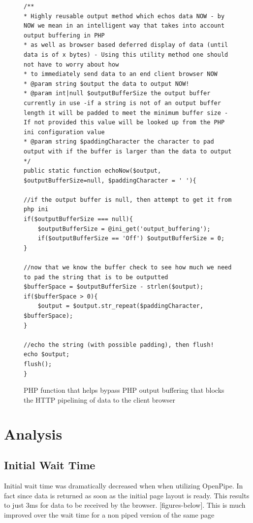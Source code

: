 \documentclass[12pt]{report}
\begin{document}
\begin{figure}[H]
\caption{PHP function that helps bypass PHP output buffering that blocks the HTTP pipelining of data to the client browser}
\label{fig:echoNowCode}
\begin{lstlisting}
/**
* Highly reusable output method which echos data NOW - by NOW we mean in an intelligent way that takes into account output buffering in PHP
* as well as browser based deferred display of data (until data is of x bytes) - Using this utility method one should not have to worry about how 
* to immediately send data to an end client browser NOW
* @param string $output the data to output NOW!
* @param int|null $outputBufferSize the output buffer currently in use -if a string is not of an output buffer length it will be padded to meet the minimum buffer size - If not provided this value will be looked up from the PHP ini configuration value 
* @param string $paddingCharacter the character to pad output with if the buffer is larger than the data to output
*/
public static function echoNow($output, $outputBufferSize=null, $paddingCharacter = ' '){

//if the output buffer is null, then attempt to get it from php ini
if($outputBufferSize === null){
	$outputBufferSize = @ini_get('output_buffering');
	if($outputBufferSize == 'Off') $outputBufferSize = 0;
}
		
//now that we know the buffer check to see how much we need to pad the string that is to be outputted
$bufferSpace = $outputBufferSize - strlen($output);
if($bufferSpace > 0){
	$output = $output.str_repeat($paddingCharacter, $bufferSpace);
}

//echo the string (with possible padding), then flush!
echo $output;
flush();
}
\end{lstlisting}
\end{figure}


\chapter{Analysis}

\section{Initial Wait Time}
Initial wait time was dramatically decreased when when utilizing OpenPipe. In fact since data is returned as soon as the initial page layout is ready. This results to just 3ms for data to be received by the browser. [figures-below]. This is much improved over the wait time for a non piped version of the same page
\end{document}
